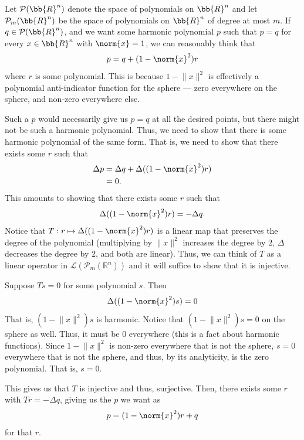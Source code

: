 \documentclass[12pt,letterpaper]{hmcpset}
\begin{document}
\begin{solution}
	Let $\mathcal{P}(\bb{R}^n)$ denote the space of polynomials on $\bb{R}^n$ and let $\mathcal{P}_m(\bb{R}^n)$ be the space of polynomials on $\bb{R}^n$ of degree at most $m$.
	If $q \in \mathcal{P}(\bb{R}^n)$, and we want some harmonic polynomial $p$ such that \( p = q \) for every \( x \in \bb{R}^n \) with \( \norm{x} = 1 \), we can reasonably think that
	\[
		p = q + (1 - \norm{x}^2)r
	\]
	where $r$ is some polynomial. This is because $1 - \lVert x \rVert^{2}$ is effectively a polynomial anti-indicator function for the sphere --- zero everywhere on the sphere, and non-zero everywhere else. 

	Such a $p$ would necessarily give us \( p = q \) at all the desired points, but there might not be such a harmonic polynomial. Thus, we need to show that there is some harmonic polynomial of the same form. That is, we need to show that there exists some $r$ such that
	\[
		\begin{split}
			\Delta p & = \Delta q + \Delta ((1 - \norm{x}^2)r) \\
				 & = 0.
		\end{split}
	\]
	This amounts to showing that there exists some $r$ such that
	\[
		\Delta ((1 - \norm{x}^2)r) = -\Delta q.
	\]
	Notice that \( T : r \mapsto \Delta ((1 - \norm{x}^2)r) \) is a linear map that preserves the degree of the polynomial (multiplying by $\lVert x \rVert^{2}$ increases the degree by $2$, $\Delta$ decreases the degree by $2$, and both are linear). Thus, we can think of $T$ as a linear operator in $\mathcal{L}(\mathcal{P}_{m}(\mathbb{R}^{n}))$ and it will suffice to show that it is injective. 
		
	Suppose \( Ts = 0 \) for some polynomial $s$. Then
	\[
		\Delta ((1 - \norm{x}^2) s) = 0
	\]
	That is, $(1 - \lVert x \rVert^{2}) s$ is harmonic. Notice that $(1 - \lVert x \rVert^{2}) s = 0$ on the sphere as well. Thus, it must be $0$ everywhere (this is a fact about harmonic functions). Since $1 - \lVert x \rVert^{2}$ is non-zero everywhere that is not the sphere, $s = 0$ everywhere that is not the sphere, and thus, by its analyticity, is the zero polynomial. That is, $s = 0$. 
	
	This gives us that $T$ is injective and thus, surjective. Then, there exists some $r$ with $Tr = - \Delta q$, giving us the $p$ we want as
	\[
		p = (1 - \norm{x}^2) r + q
	\]
	for that $r$.
\end{solution}

\pagebreak
\end{document}
